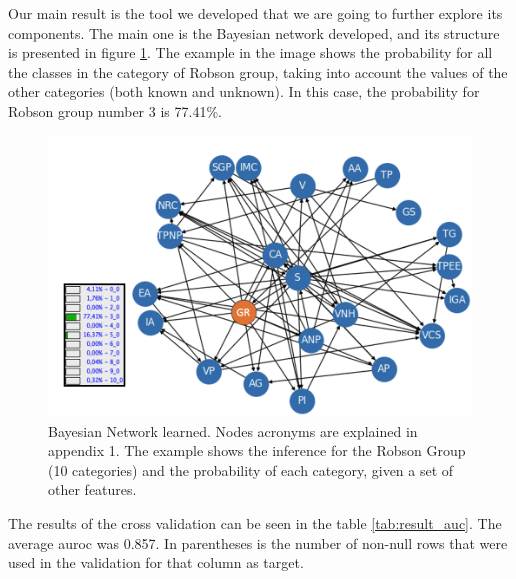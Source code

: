 
Our main result is the tool we developed that we are going to further explore its components. The main one is the Bayesian network developed, and its structure is presented in figure \ref{fig:network}. The example in the image shows the probability for all the classes in the category of Robson group, taking into account the values of the other categories (both known and unknown). In this case, the probability for Robson group number 3 is 77.41\%. 
\begin{figure}[h!]
    \centering
    \caption{Bayesian Network learned. Nodes acronyms are explained in appendix 1. The example shows the inference for the Robson Group (10 categories) and the probability of each category, given a set of other features.} \label{fig:network} 
    \includegraphics[scale=0.38]{figures/new-bn.png}
\end{figure}

The results of the cross validation can be seen in the table \ref{tab:result_auc}. The average \ac{auroc} was 0.857. In parentheses is the number of non-null rows that were used in the validation for that column as target.


